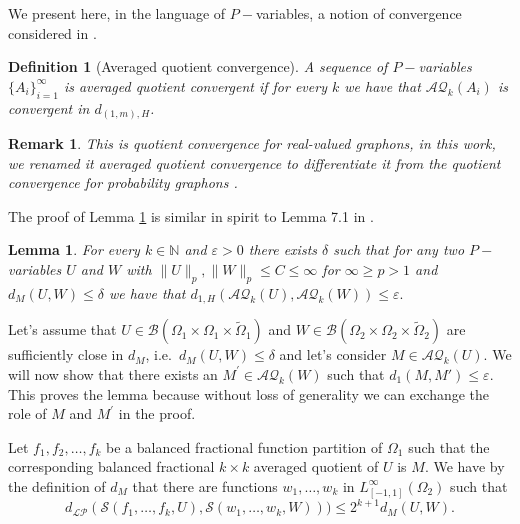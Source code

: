 \documentclass[11pt]{article}
\newtheorem{lemma}[theorem]{Lemma}
\newtheorem{definition}[theorem]{Definition}
\newtheorem{remark}[theorem]{Remark}
\def\N{\mathbb{N}}
\newcommand{\cS}{{\mathcal S}}  %
\begin{document}
We present here, in the language of $P-$variables, a notion of convergence considered in \cite{KUNSZENTIKOVACS20191,backhausz2018action,Lpgraphon2,local-global1,borgs2011convergentAnnals}. 

\begin{definition}[Averaged quotient convergence] A sequence of $P-$variables $\{A_i\}_{i=1}^\infty$ is averaged quotient convergent if for every $k$ we have that $\mathcal{AQ}_k(A_i)$ is convergent in $d_{(1,m),H}$. 
\end{definition}
\begin{remark}
This is quotient convergence for real-valued graphons, in this work, we renamed it averaged quotient convergence to differentiate it from the quotient convergence for probability graphons \cite{zucal2024probabilitygraphonsrightconvergence}.    
\end{remark}

The proof of Lemma \ref{LemmadMAverageQuotconv} is similar in spirit to Lemma 7.1 in \cite{backhausz2018action}.
\begin{lemma}\label{LemmadMAverageQuotconv}
For every $k\in \N$ and $\varepsilon >0$ there exists $\delta$ such that for any two $P-$variables $U$ and $W$ with $\|U\|_p,\|W\|_p\leq C\leq \infty $ for $\infty \geq p>1$ and $d_M(U,W)\leq\delta$ we have that $d_{1,H}(\mathcal{AQ}_k(U),\mathcal{AQ}_k(W))\leq\varepsilon.$
\end{lemma}
\proof
Let's assume that $U\in\mathcal{B}(\Omega_1\times \Omega_1 \times \widetilde \Omega_1)$ and $W\in\mathcal{B}(\Omega_2\times \Omega_2 \times \widetilde \Omega_2)$ are sufficiently close in $d_M$, i.e.\ $d_M(U,W)\leq\delta$ and let's consider $M\in \mathcal{AQ}_k(U)$. We will now show that there exists an $M^\prime\in \mathcal{AQ}_k(W)$ such that $d_1(M,M')\leq\varepsilon$. This proves the lemma because without loss of generality we can exchange the role of $M$ and $M^{\prime}$ in the proof.  

Let $f_1,f_2,\dots,f_k$ be a balanced fractional function partition of $\Omega_1$ such that the corresponding balanced fractional $k\times k$ averaged quotient of $U$ is $M$. We have by the definition of $d_M$ that there are functions $w_1,\ldots,w_k$ in $L^\infty_{[-1,1]}(\Omega_2)$ such that $$d_{\mathcal{LP}}(\cS(f_1,\dots,f_k,U),\cS(w_1,\ldots, w_k,W)))\leq 2^{k+1}d_M(U,W).$$
\end{document}

